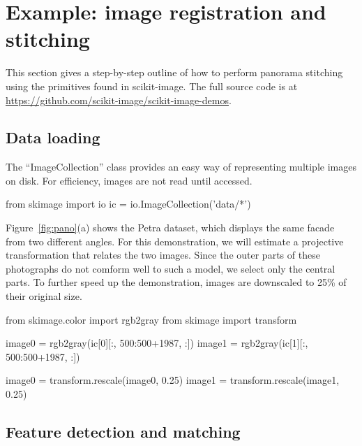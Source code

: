 
\section*{Example: image registration and stitching}
  \label{sec:example-image-registration-and-stitching}

  This section gives a step-by-step outline of how to perform panorama stitching using the primitives found in scikit-image. The full source code is at \url{https://github.com/scikit-image/scikit-image-demos}.

  \subsection{Data loading}
    \label{sub:data_loading}

    The ``ImageCollection'' class provides an easy way of representing multiple images on disk. For efficiency, images are not read until accessed.

    \begin{pyverbatim}
      from skimage import io
      ic = io.ImageCollection('data/*')
    \end{pyverbatim}

    Figure~\ref{fig:pano}(a) shows the Petra dataset, which displays the same facade from two different angles. For this demonstration, we will estimate a projective transformation that relates the two images. Since the outer parts of these photographs do not comform well to such a model, we select only the central parts. To further speed up the demonstration, images are downscaled to 25\% of their original size.

    \begin{pyverbatim}
      from skimage.color import rgb2gray
      from skimage import transform

      image0 = rgb2gray(ic[0][:, 500:500+1987, :])
      image1 = rgb2gray(ic[1][:, 500:500+1987, :])

      image0 = transform.rescale(image0, 0.25)
      image1 = transform.rescale(image1, 0.25)
    \end{pyverbatim}

  \subsection{Feature detection and matching}
    \label{sub:feature_detection_and_matching}

